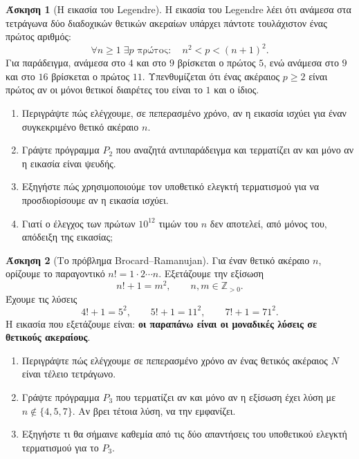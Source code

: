 \documentclass[11pt,a4paper]{article}
\theoremstyle{definition}
\newtheorem{question}{Άσκηση}
\begin{document}
\begin{question}[Η εικασία του Legendre]
Η εικασία του Legendre λέει ότι ανάμεσα στα τετράγωνα δύο διαδοχικών
θετικών ακεραίων υπάρχει πάντοτε τουλάχιστον ένας πρώτος αριθμός:
\[
\forall n\geq 1\;\exists p\text{ πρώτος}:\quad n^2<p<(n+1)^2.
\]
Για παράδειγμα, ανάμεσα στο $4$ και στο $9$ βρίσκεται ο πρώτος $5$,
ενώ ανάμεσα στο $9$ και στο $16$ βρίσκεται ο πρώτος $11$.
Υπενθυμίζεται ότι ένας ακέραιος $p\geq 2$ είναι πρώτος αν οι μόνοι
θετικοί διαιρέτες του είναι το $1$ και ο ίδιος.
\begin{enumerate}
\item Περιγράψτε πώς ελέγχουμε, σε πεπερασμένο χρόνο, αν η εικασία
ισχύει για έναν συγκεκριμένο θετικό ακέραιο $n$.
\item Γράψτε πρόγραμμα $P_2$ που αναζητά αντιπαράδειγμα και τερματίζει
αν και μόνο αν η εικασία είναι ψευδής.
\item Εξηγήστε πώς χρησιμοποιούμε τον υποθετικό ελεγκτή τερματισμού
για να προσδιορίσουμε αν η εικασία ισχύει.
\item Γιατί ο έλεγχος των πρώτων $10^{12}$ τιμών του $n$ δεν αποτελεί,
από μόνος του, απόδειξη της εικασίας;
\end{enumerate}
\end{question}



\begin{question}[Το πρόβλημα Brocard--Ramanujan]
Για έναν θετικό ακέραιο $n$, ορίζουμε το παραγοντικό
$n!=1\cdot2\cdots n$. Εξετάζουμε την εξίσωση
\[
n!+1=m^2,\qquad n,m\in\mathbb{Z}_{>0}.
\]
Έχουμε τις λύσεις
\[
4!+1=5^2,\qquad 5!+1=11^2,\qquad 7!+1=71^2.
\]
Η εικασία που εξετάζουμε είναι: \textbf{οι παραπάνω είναι οι μοναδικές
λύσεις σε θετικούς ακεραίους}.
\begin{enumerate}
\item Περιγράψτε πώς ελέγχουμε σε πεπερασμένο χρόνο αν ένας θετικός
ακέραιος $N$ είναι τέλειο τετράγωνο.
\item Γράψτε πρόγραμμα $P_3$ που τερματίζει αν και μόνο αν η εξίσωση
έχει λύση με $n\notin\{4,5,7\}$. Αν βρει τέτοια λύση, να την εμφανίζει.
\item Εξηγήστε τι θα σήμαινε καθεμία από τις δύο απαντήσεις του
υποθετικού ελεγκτή τερματισμού για το $P_3$.
\end{enumerate}
\end{question}
\end{document}

